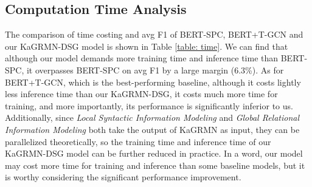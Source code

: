 \subsection{Computation Time Analysis}
\begin{table}[t]
\fontsize{8}{10}\selectfont
\centering
\caption{Comparison of training time and inference time (per sample) as well as the avg F1 on the three datasets.}
\label{table: time}
\end{table}
The comparison of time costing and avg F1 of BERT-SPC, BERT+T-GCN and our KaGRMN-DSG model is shown in Table \ref{table: time}.
We can find that although our model demands more training time and inference time than BERT-SPC, it overpasses BERT-SPC on avg F1 by a large margin (6.3\%).
As for BERT+T-GCN, which is the best-performing baseline, although it costs lightly less inference time than our KaGRMN-DSG, it costs much more time for training, and more importantly, its performance is significantly inferior to us.
Additionally, since \textit{Local Syntactic Information Modeling} and \textit{Global Relational Information Modeling} both take the output of KaGRMN as input, they can be parallelized theoretically, so the training time and inference time of our KaGRMN-DSG model can be further reduced in practice.
In a word, our model may cost more time for training and inference than some baseline models, but it is worthy considering the significant performance improvement.







